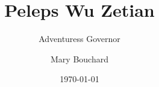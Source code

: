 ﻿\documentclass[10pt,twocolumn,twoside]{book}
\title{Peleps Wu Zetian}
\subtitle{Adventuress Governor}
\author{Mary Bouchard}
\date{\ddmmmyyyydate\today}
\begin{document}
\frontmatter
{}
\pagestyle{empty}

\begin{titlepage}
    \MakeExaltedTitle
\end{titlepage}

\cleardoublepage

\mainmatter
\pagestyle{main}





\end{document}
